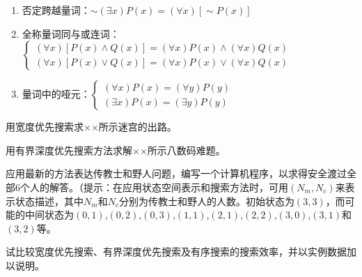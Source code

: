 \begin{solution}
\begin{enumerate}
		\item 否定跨越量词：$\sim (\exists x) P(x) = (\forall x)[\sim P(x)]$
		\item 全称量词同与或连词：$\begin{cases}
		(\forall x)[P(x) \wedge Q(x)] = (\forall x) P(x) \wedge (\forall x) Q(x) \\
		(\forall x)[P(x) \vee Q(x)] = (\forall x) P(x) \vee (\forall x) Q(x)
		\end{cases}$
		\item 量词中的哑元：$\begin{cases}
		(\forall x) P(x) = (\forall y) P(y) \\
		(\exists x) P(x) = (\exists y) P(y)
		\end{cases}$
	\end{enumerate}
\end{solution}

\begin{question}
用宽度优先搜索求××所示迷宫的出路。
\end{question}
\begin{solution}
\end{solution}

\begin{question}
用有界深度优先搜索方法求解××所示八数码难题。
\end{question}
\begin{solution}
\end{solution}

\begin{question}
应用最新的方法表达传教士和野人问题，编写一个计算机程序，以求得安全渡过全部$6$个人的解答。（提示：在应用状态空间表示和搜索方法时，可用$(N_m,N_c)$来表示状态描述，其中$N_m$和$N_c$分别为传教士和野人的人数。初始状态为$(3,3)$，而可能的中间状态为$(0,1)$,$(0,2)$,$(0,3)$,$(1,1)$,$(2,1)$,$(2,2)$,$(3,0)$,$(3,1)$和$(3,2)$等。
\end{question}
\begin{solution}
\end{solution}

\begin{question}
试比较宽度优先搜索、有界深度优先搜索及有序搜索的搜索效率，并以实例数据加以说明。
\end{question}
\begin{solution}
\end{solution}

